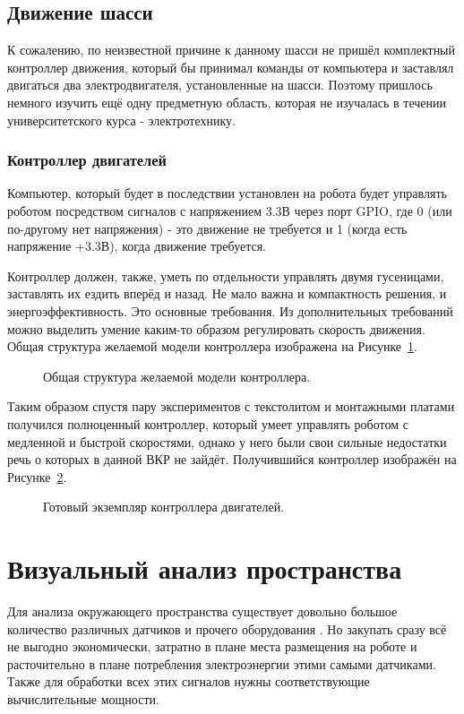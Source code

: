 \subsection{Движение шасси}

К сожалению, по неизвестной причине к данному шасси не пришёл комплектный контроллер движения, который бы принимал команды от компьютера и заставлял двигаться два электродвигателя, установленные на шасси. Поэтому пришлось немного изучить ещё одну предметную область, которая не изучалась в течении университетского курса - электротехнику. 

\subsubsection{Контроллер двигателей}

Компьютер, который будет в последствии установлен на робота будет управлять роботом посредством сигналов с напряжением 3.3В через порт GPIO, где 0 (или по-другому нет напряжения) - это движение не требуется и 1 (когда есть напряжение +3.3В), когда движение требуется.

Контроллер должен, также, уметь по отдельности управлять двумя гусеницами, заставлять их ездить вперёд и назад. Не мало важна и компактность решения, и энергоэффективность. Это основные требования. Из дополнительных требований можно выделить умение каким-то образом регулировать скорость движения. Общая структура желаемой модели контроллера изображена на Рисунке~\ref{fig:structure-controller}. 

\begin{figure}[ht]
  \caption{Общая структура желаемой модели контроллера.}\label{fig:structure-controller}
\end{figure}

Таким образом спустя пару экспериментов с текстолитом и монтажными платами получился полноценный контроллер, который умеет управлять роботом с медленной и быстрой скоростями, однако у него были свои сильные недостатки речь о которых в данной ВКР не зайдёт. Получившийся контроллер изображён на Рисунке~\ref{fig:robot-controller}.

\begin{figure}[ht]
  \caption{Готовый экземпляр контроллера двигателей.}\label{fig:robot-controller}
\end{figure}

\section{Визуальный анализ пространства}
Для анализа окружающего пространства существует довольно большое количество различных датчиков и прочего оборудования . Но закупать сразу всё не выгодно экономически, затратно в плане места размещения на роботе и расточительно в плане потребления электроэнергии этими самыми датчиками. Также для обработки всех этих сигналов нужны соответствующие вычислительные мощности. 

